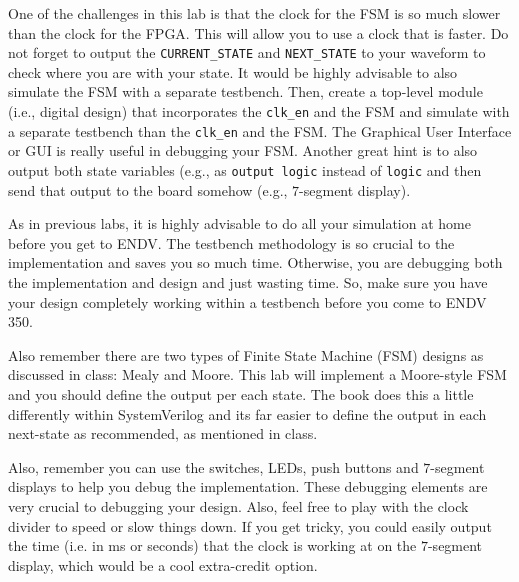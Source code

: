 \documentclass{article}
\begin{document}
One of the challenges in this lab is that the clock for the FSM is so
much slower than the clock for the FPGA.  This will allow you to use a
clock that is faster.  Do not forget to output the
\verb!CURRENT_STATE! and \verb!NEXT_STATE! to your waveform to check
where you are with your state.
It would be highly advisable
to also simulate the FSM with a separate testbench.  Then, create a
top-level module (i.e., digital design) that incorporates the
\verb!clk_en! and the FSM and simulate with a separate testbench than
the \verb!clk_en! and the FSM.  The Graphical User Interface or GUI
is really useful in debugging your FSM. Another great hint
is to also output both
state variables (e.g., as \verb!output logic! instead of \verb!logic! and then send
that output to the board somehow (e.g., $7$-segment display).

As in previous labs, it is highly advisable to do all your simulation
at home before you get to ENDV.  The testbench methodology is so
crucial to the implementation and saves you so much time.  Otherwise,
you are debugging both the implementation and design and just wasting
time.  So, make sure you have your design completely working within a
testbench before you come to ENDV 350.

Also remember there are two types of Finite State Machine (FSM)
designs as discussed in class:
Mealy and Moore.  This lab will implement a Moore-style FSM and you
should define the output per each state.  The book does this a little
differently within SystemVerilog and its far
easier to define the
output in each next-state as recommended, as mentioned in class.

Also, remember you can use the switches, LEDs, push buttons and
$7$-segment displays to help you debug the implementation.  These
debugging elements are very crucial to debugging your design.  Also,
feel free to play with the clock divider to speed or slow things
down.  If you get tricky, you could easily output the time (i.e. in
ms or seconds) that the
clock is working at on the $7$-segment display, which would be a cool
extra-credit option.  



\end{document}
